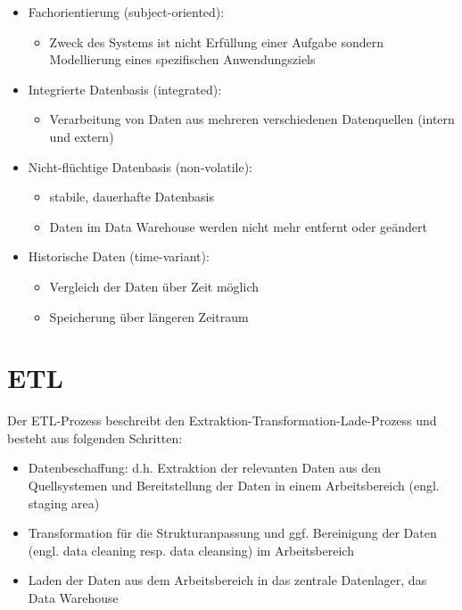 \begin{itemize}
    \item Fachorientierung (subject-oriented):
    \begin{itemize}
        \item Zweck des Systems ist nicht Erfüllung einer Aufgabe sondern Modellierung eines spezifischen Anwendungsziels
    \end{itemize}
    \item Integrierte Datenbasis (integrated):
    \begin{itemize}
        \item Verarbeitung von Daten aus mehreren verschiedenen Datenquellen (intern und extern)
    \end{itemize}
    \item Nicht-flüchtige Datenbasis (non-volatile):
    \begin{itemize}
        \item stabile, dauerhafte Datenbasis
        \item Daten im Data Warehouse werden nicht mehr entfernt oder geändert       
    \end{itemize}
    \item Historische Daten (time-variant):
    \begin{itemize}
        \item Vergleich der Daten über Zeit möglich
        \item Speicherung über längeren Zeitraum
    \end{itemize}
\end{itemize}

\section{ETL}

Der ETL-Prozess beschreibt den Extraktion-Transformation-Lade-Prozess und besteht aus folgenden Schritten:
\begin{itemize}
    \item Datenbeschaffung: d.h. Extraktion der relevanten Daten aus den Quellsystemen und Bereitstellung der Daten in einem Arbeitsbereich (engl. staging area)
    \item Transformation für die Strukturanpassung und ggf. Bereinigung der Daten (engl. data cleaning resp. data cleansing) im Arbeitsbereich
    \item Laden der Daten aus dem Arbeitsbereich in das zentrale Datenlager, das Data Warehouse
\end{itemize}

